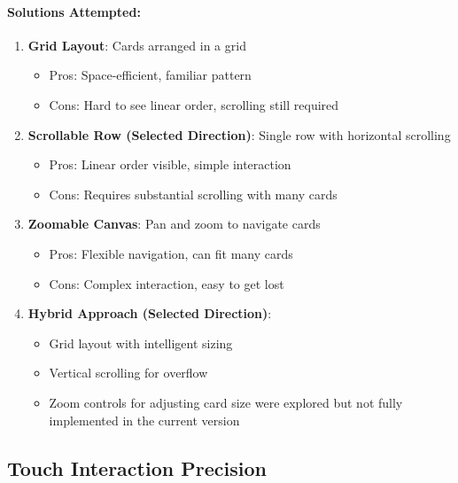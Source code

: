 \paragraph*{Solutions Attempted:}

\begin{enumerate}
    \item \textbf{Grid Layout}: Cards arranged in a grid
          \begin{itemize}
              \item Pros: Space-efficient, familiar pattern
              \item Cons: Hard to see linear order, scrolling still required
          \end{itemize}

    \item \textbf{Scrollable Row (Selected Direction)}: Single row with horizontal scrolling
          \begin{itemize}
              \item Pros: Linear order visible, simple interaction
              \item Cons: Requires substantial scrolling with many cards
          \end{itemize}

    \item \textbf{Zoomable Canvas}: Pan and zoom to navigate cards
          \begin{itemize}
              \item Pros: Flexible navigation, can fit many cards
              \item Cons: Complex interaction, easy to get lost
          \end{itemize}

    \item \textbf{Hybrid Approach (Selected Direction)}:
          \begin{itemize}
              \item Grid layout with intelligent sizing
              \item Vertical scrolling for overflow
              \item Zoom controls for adjusting card size were explored but not fully implemented in the current version
          \end{itemize}
\end{enumerate}

\subsection{Touch Interaction Precision}
\label{subsec:touch-precision}


